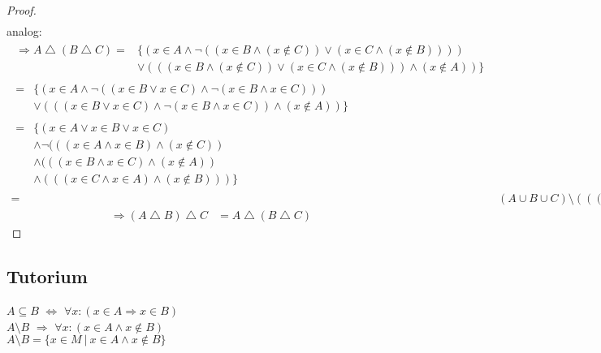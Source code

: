 \begin{proof}
\begin{align}
\end{align}
analog:
\begin{align}
\begin{split}
\Rightarrow A\bigtriangleup(B\bigtriangleup C)=&\{(x\in A\wedge\neg((x\in B\wedge(x\notin C))\vee(x\in C\wedge(x\notin B))))\\
&\vee(((x\in B\wedge(x\notin C))\vee(x\in C\wedge(x\notin B)))\wedge(x\notin A))\}
\end{split}\\
\begin{split}
=&\{(x\in A\wedge\neg((x\in B\vee x\in C)\wedge\neg(x\in B\wedge x\in C)))\\
&\vee(((x\in B\vee x\in C)\wedge\neg(x\in B\wedge x\in C))\wedge(x\notin A))\}
\end{split}\\
\begin{split}
=&\{(x\in A\vee x\in B\vee x\in C)\\
&\wedge\neg(((x\in A\wedge x\in B)\wedge(x\notin C))\\
&\wedge(((x\in B\wedge x\in C)\wedge(x\notin A))\\
&\wedge(((x\in C\wedge x\in A)\wedge(x\notin B)))\}
\end{split}\\
=&(A\cup B\cup C)\setminus(((A\cap B)\cup(B\cap C)\cup(C\cap A))\setminus(A\cap B\cap C))
\end{align}
\begin{align}
\Rightarrow (A\bigtriangleup B)\bigtriangleup C&=A\bigtriangleup(B\bigtriangleup C)
\end{align}
\end{proof}

\newpage

\subsection{Tutorium}
$A\subseteq B$ $\Leftrightarrow$ $\forall x:(x\in A\Rightarrow x\in B)$\\
$A\setminus B$ $\Rightarrow$ $\forall x:(x\in A\wedge x\notin B)$\\
$A\setminus B=\{x\in M\ |\ x\in A\wedge x\notin B\}$
